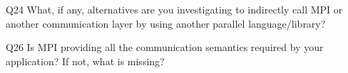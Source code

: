 \begin{description}%
\item{Q24} What, if any, alternatives are you investigating to indirectly call MPI or another communication layer by using another parallel language/library?%
\item{Q26} Is MPI providing all the communication semantics required by your application? If not, what is missing?%
\end{description}%
